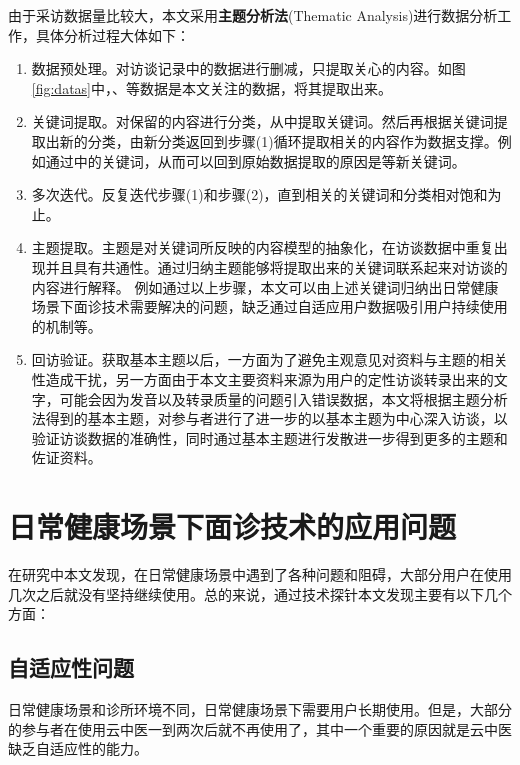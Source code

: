由于采访数据量比较大，本文采用\textbf{主题分析法}(Thematic Analysis)进行数据分析工作，具体分析过程大体如下：
\begin{enumerate}
    \item 数据预处理。对访谈记录中的数据进行删减，只提取关心的内容。如图\ref{fig:datas}中，、等数据是本文关注的数据，将其提取出来。

    \item 关键词提取。对保留的内容进行分类，从中提取关键词。然后再根据关键词提取出新的分类，由新分类返回到步骤(1)循环提取相关的内容作为数据支撑。例如通过中的关键词，从而可以回到原始数据提取的原因是等新关键词。
    
    \item 多次迭代。反复迭代步骤(1)和步骤(2)，直到相关的关键词和分类相对饱和为止。

    \item 主题提取。主题是对关键词所反映的内容模型的抽象化，在访谈数据中重复出现并且具有共通性。通过归纳主题能够将提取出来的关键词联系起来对访谈的内容进行解释。
    例如通过以上步骤，本文可以由上述关键词归纳出日常健康场景下面诊技术需要解决的问题，缺乏通过自适应用户数据吸引用户持续使用的机制等。

    \item 回访验证。获取基本主题以后，一方面为了避免主观意见对资料与主题的相关性造成干扰，另一方面由于本文主要资料来源为用户的定性访谈转录出来的文字，可能会因为发音以及转录质量的问题引入错误数据，本文将根据主题分析法得到的基本主题，对参与者进行了进一步的以基本主题为中心深入访谈，以验证访谈数据的准确性，同时通过基本主题进行发散进一步得到更多的主题和佐证资料。
\end{enumerate}


\section{日常健康场景下面诊技术的应用问题}

在研究中本文发现，在日常健康场景中遇到了各种问题和阻碍，大部分用户在使用几次之后就没有坚持继续使用。总的来说，通过技术探针本文发现主要有以下几个方面：

\subsection{自适应性问题}

日常健康场景和诊所环境不同，日常健康场景下需要用户长期使用。但是，大部分的参与者在使用云中医一到两次后就不再使用了，其中一个重要的原因就是云中医缺乏自适应性的能力。

